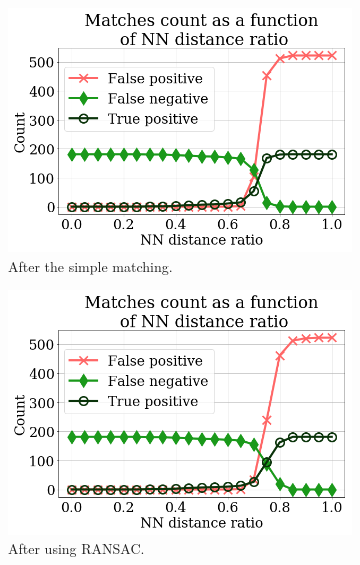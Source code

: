 \documentclass[fleqn,10pt]{wlpeerj} %
\begin{document}
\begin{figure}[H]
\centering
\hspace*{-0.36em}
\begin{minipage}{1.08\textwidth}
\begin{subfigure}{0.324\textwidth}
    \includegraphics[width=1\linewidth]{figure_distance_ratio_None.png}
    \caption{After the simple matching.}
    \label{res:1}
\end{subfigure}
\begin{subfigure}{0.324\textwidth}
    \includegraphics[width=1\linewidth]{figure_distance_ratio_with_Robust.png}
    \caption{After using RANSAC.}
    \label{res:2}
\end{subfigure}
\begin{subfigure}{0.324\textwidth}

\end{subfigure}
\end{minipage}
\end{figure}
\end{document}
